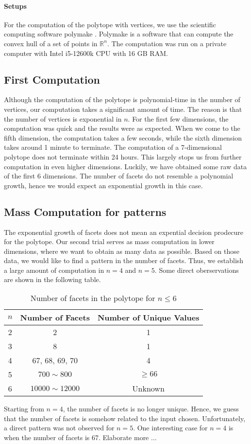 \documentclass[12pt,letterpaper]{article}
\newcommand*{\R}{\mathbb{R}}
\begin{document}
\paragraph{Setups}
For the computation of the polytope with vertices, we use the scientific computing software polymake \cite{assarf2017computing}.
Polymake is a software that can compute the convex hull of a set of points in $\R^n$. 
The computation was run on a private computer with Intel i5-12600k CPU with 16 GB RAM. 

\subsection{First Computation}
Although the computation of the polytope is polynomial-time in the number of vertices, our computation takes 
a significant amount of time. The reason is that the number of vertices is exponential in $n$. 
For the first few dimensions, the computation was quick and the results were as expected.
When we come to the fifth dimension, the computation takes a few seconds, while the sixth dimension 
takes around 1 minute to terminate. The computation of a 7-dimensional polytope does not terminate within 24 hours. 
This largely stops us from further computation in even higher dimensions. 
Luckily, we have obtained some raw data of the first 6 dimensions. 
The number of facets do not resemble a polynomial growth, hence we would expect an exponential growth in this case.

\subsection{Mass Computation for patterns}
The exponential growth of facets does not mean an expential decision prodecure for the polytope. 
Our second trial serves as mass computation in lower dimensions, where we want to obtain 
as many data as possible. Based on those data, we would like to find a pattern in 
the number of facets. Thus, we establish a large amount of 
computation in $n = 4$ and $n = 5$. Some direct oberservations are shown in the following table. 
\begin{table}[ht]
    \centering
    \begin{tabular}{||c | c | c ||}
        \hline 
        $n$ & Number of Facets & Number of Unique Values\\
        \hline 
        \hline 
 2 & 2 & 1\\
        \hline 
 3 & 8 & 1\\
        \hline 
 4 & 67, 68, 69, 70 & 4\\
        \hline 
 5 & $700 \sim 800$ & $\geq 66$\\
        \hline 
 6 & $10000 \sim 12000$  & Unknown\\
        \hline 
    \end{tabular}
    \caption{Number of facets in the polytope for $n \leq 6$}
\end{table}
Starting from $n = 4$, the number of facets is no longer unique. 
Hence, we guess that the number of facets is somehow related to the input chosen. 
Unfortunately, a direct pattern was not observed for $n=5$.
One interesting case for $n = 4$ is when the number of facets is 67. Elaborate more ...
\end{document}

